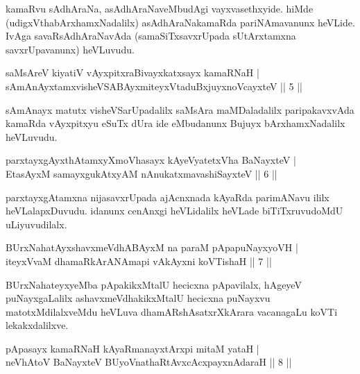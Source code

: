 \begin{artha}
kamaRvu sAdhAraNa, asAdhAraNaveMbudAgi vayxvasethxyide. hiMde (udigxVthabArxhamxNadalilx) asAdhAraNakamaRda pariNAmavanunx heVLide. IvAga savaRsAdhAraNavAda (samaSiTxsavxrUpada sUtArxtamxna savxrUpavanunx) heVLuvudu.
\end{artha}


\begin{shl}
saMsAreV kiyatiV vAyxpitxraBivayxkatxsayx kamaRNaH |\\
sAmAnAyxtamxvisheVSABAyxmiteyxVtaduBxjuyxnoVcayxteV \hfill || 5 ||
\end{shl}

\begin{artha}
sAmAnayx matutx visheVSarUpadalilx saMsAra maMDaladalilx paripakavxvAda kamaRda vAyxpitxyu eSuTx dUra ide eMbudanunx Bujuyx bArxhamxNadalilx heVLuvudu.
\end{artha}

\begin{shl}
parxtayxgAyxthAtamxyXmoVhasayx kAyeVyatetxVha BaNayxteV |\\
EtasAyxM samayxgukAtxyAM nAnukatxmavashiSayxteV \hfill || 6 ||
\end{shl}

\begin{artha}
parxtayxgAtamxna nijasavxrUpada ajAcnxnada kAyaRda parimANavu ililx heVLalapxDuvudu. idanunx cenAnxgi heVLidalilx heVLade biTiTxruvudoMdU uLiyuvudilalx.
\end{artha}


\begin{shl}
BUrxNahatAyxshavxmeVdhABAyxM na paraM pApapuNayxyoVH |\\
iteyxVvaM dhamaRkArANAmapi vAkAyxni koVTishaH \hfill || 7 ||
\end{shl}

\begin{artha}
BUrxNahateyxyeMba pApakikxMtalU hecicxna pApavilalx, hAgeyeV puNayxgaLalilx ashavxmeVdhakikxMtalU hecicxna puNayxvu matotxMdilalxveMdu heVLuva dhamARshAsatxrXkArara vacanagaLu koVTi lekakxdalilxve.
\end{artha}


\begin{shl}
pApasayx kamaRNaH kAyaRmanayxtArxpi mitaM yataH |\\
neVhAtoV BaNayxteV  BUyoV\s nathaRtAvxcAcxpayxnAdaraH \hfill || 8 ||
\end{shl}

